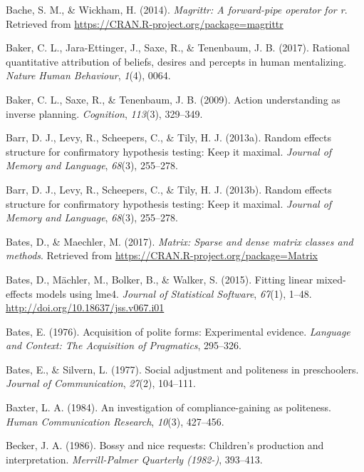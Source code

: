 \documentclass[oneside]{report}
\begin{document}
\hypertarget{ref-R-magrittr}{}
Bache, S. M., \& Wickham, H. (2014). \emph{Magrittr: A forward-pipe
operator for r}. Retrieved from
\url{https://CRAN.R-project.org/package=magrittr}

\hypertarget{ref-baker2017rational}{}
Baker, C. L., Jara-Ettinger, J., Saxe, R., \& Tenenbaum, J. B. (2017).
Rational quantitative attribution of beliefs, desires and percepts in
human mentalizing. \emph{Nature Human Behaviour}, \emph{1}(4), 0064.

\hypertarget{ref-baker2009action}{}
Baker, C. L., Saxe, R., \& Tenenbaum, J. B. (2009). Action understanding
as inverse planning. \emph{Cognition}, \emph{113}(3), 329--349.

\hypertarget{ref-barr2013}{}
Barr, D. J., Levy, R., Scheepers, C., \& Tily, H. J. (2013a). Random
effects structure for confirmatory hypothesis testing: Keep it maximal.
\emph{Journal of Memory and Language}, \emph{68}(3), 255--278.

\hypertarget{ref-barr2013random}{}
Barr, D. J., Levy, R., Scheepers, C., \& Tily, H. J. (2013b). Random
effects structure for confirmatory hypothesis testing: Keep it maximal.
\emph{Journal of Memory and Language}, \emph{68}(3), 255--278.

\hypertarget{ref-R-Matrix}{}
Bates, D., \& Maechler, M. (2017). \emph{Matrix: Sparse and dense matrix
classes and methods}. Retrieved from
\url{https://CRAN.R-project.org/package=Matrix}

\hypertarget{ref-R-lme4}{}
Bates, D., Mächler, M., Bolker, B., \& Walker, S. (2015). Fitting linear
mixed-effects models using lme4. \emph{Journal of Statistical Software},
\emph{67}(1), 1--48. \url{http://doi.org/10.18637/jss.v067.i01}

\hypertarget{ref-bates1976}{}
Bates, E. (1976). Acquisition of polite forms: Experimental evidence.
\emph{Language and Context: The Acquisition of Pragmatics}, 295--326.

\hypertarget{ref-bates1977}{}
Bates, E., \& Silvern, L. (1977). Social adjustment and politeness in
preschoolers. \emph{Journal of Communication}, \emph{27}(2), 104--111.

\hypertarget{ref-baxter1984}{}
Baxter, L. A. (1984). An investigation of compliance-gaining as
politeness. \emph{Human Communication Research}, \emph{10}(3), 427--456.

\hypertarget{ref-becker1986}{}
Becker, J. A. (1986). Bossy and nice requests: Children's production and
interpretation. \emph{Merrill-Palmer Quarterly (1982-)}, 393--413.
\end{document}
